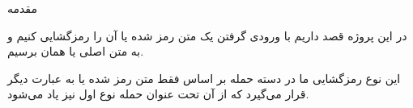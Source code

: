 \Problem
{مقدمه}
{
در این پروژه قصد داریم با ورودی گرفتن یک متن رمز شده یا
آن را رمزگشایی کنیم و به متن اصلی یا همان
برسیم.

این نوع رمزگشایی ما در دسته حمله بر اساس فقط متن رمز شده یا به عبارت دیگر
قرار می‌گیرد که از آن تحت عنوان حمله نوع اول نیز یاد می‌شود.
}
